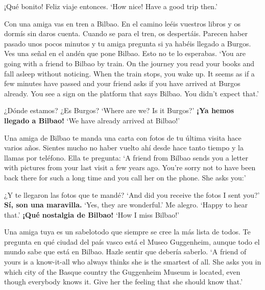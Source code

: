 \begin{exe}
\begin{xlist}[A:]
	 ¡Qué bonito! Feliz viaje entonces. \href{https://osf.io/svjb6/}{\faVolumeUp}
	\glt `How nice! Have a good trip then.' 
	\end{xlist}
\ex \label{ex:experimentoMIRDECLbilbao_APP}
	Con una amiga vas en tren a Bilbao. En el camino leéis vuestros libros y os dormís sin daros cuenta. Cuando se para el tren, os despertáis. Parecen haber pasado unos pocos minutos y tu amiga pregunta si ya habéis llegado a Burgos. Ves una señal en el andén que pone Bilbao. Esto no te lo esperabas.
	\glt `You are going with a friend to Bilbao by train. On the journey you read your books and fall asleep without noticing. When the train stops, you wake up. It seems as if a few minutes have passed and your friend asks if you have arrived at Burgos already. You see a sign on the platform that says Bilbao. You didn't expect that.' 
	\begin{xlist}[A:]
	 ¿Dónde estamos? ¿Es Burgos? \href{https://osf.io/574vu/}{\faVolumeUp}
	\glt `Where are we? Is it Burgos?' 
	 \textbf{¡Ya hemos llegado a Bilbao!} 
	\glt `We have already arrived at Bilbao!' 
	\end{xlist}
\ex \label{ex:experimentoWHEXCLbilbao_APP}
	Una amiga de Bilbao te manda una carta con fotos de tu última visita hace varios años. Sientes mucho no haber vuelto ahí desde hace tanto tiempo y la llamas por teléfono. Ella te pregunta: 
	\glt `A friend from Bilbao sends you a letter with pictures from your last visit a few years ago. You're sorry not to have been back there for such a long time and you call her on the phone. She asks you:' 
	\begin{xlist}[A:]
	 ¿Y te llegaron las fotos que te mandé? \href{https://osf.io/rbm56/}{\faVolumeUp}
	\glt `And did you receive the fotos I sent you?' 
	 \textbf{Sí, son una maravilla.} 
	\glt `Yes, they are wonderful.' 
	 Me alegro. \href{https://osf.io/y47r3/}{\faVolumeUp} 
	\glt `Happy to hear that.' 
	 \textbf{¡Qué nostalgia de Bilbao!} 
	\glt `How I miss Bilbao!' 
	\end{xlist}
\ex \label{ex:experimentoOBVDECLbilbao_APP}
	Una amiga tuya es un sabelotodo que siempre se cree la más lista de todos. Te pregunta en qué ciudad del país vasco está el Museo Guggenheim, aunque todo el mundo sabe que está en Bilbao. Hazle sentir que debería saberlo. 
	\glt `A friend of yours is a know-it-all who always thinks she is the smartest of all. She asks you in which city of the Basque country the Guggenheim Museum is located, even though everybody knows it. Give her the feeling that she should know that.' 

\end{exe}
